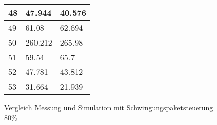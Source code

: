 \begin{appendix}
\begin{figure}[ht!]
\begin{minipage}[b]{0.4\textwidth}
\begin{tabular}{|l|l|l|}
			48                                                              & 47.944                                                           & 40.576                                                       \\ \hline
			49                                                              & 61.08                                                            & 62.694                                                       \\ \hline
			50                                                              & 260.212                                                          & 265.98                                                       \\ \hline
			51                                                              & 59.54                                                            & 65.7                                                         \\ \hline
			52                                                              & 47.781                                                           & 43.812                                                       \\ \hline
			53                                                              & 31.664                                                           & 21.939                                                       \\ \hline
		\end{tabular}
		\caption{Vergleich Messung und Simulation mit Schwingungspaketsteuerung 80\%}\label{tab:Vergleich_Schwing_80}
	\end{minipage}
\end{figure}



\newpage

\end{appendix}
